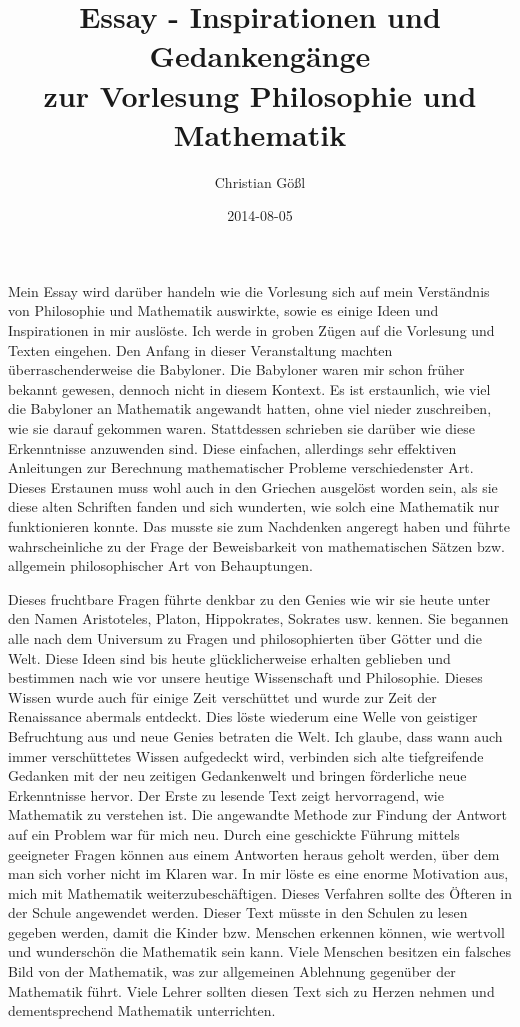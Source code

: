 \documentclass[DIN,
	fontsize=12pt,
a4paper]{scrartcl}
\title{Essay - Inspirationen und Gedankengänge\\
zur Vorlesung Philosophie und Mathematik}
\author{Christian Gößl}
\date{2014-08-05}
\begin{document}
\maketitle

\newpage

Mein Essay wird darüber handeln wie die Vorlesung sich auf mein Verständnis von Philosophie und Mathematik auswirkte, sowie es einige Ideen und Inspirationen in mir auslöste.
Ich werde in groben Zügen auf die Vorlesung und Texten eingehen.
Den Anfang in dieser Veranstaltung machten überraschenderweise die Babyloner.
Die Babyloner waren mir schon früher bekannt gewesen, dennoch nicht in diesem Kontext.
Es ist erstaunlich, wie viel die Babyloner an Mathematik angewandt hatten, ohne viel nieder zuschreiben, wie sie darauf gekommen waren.
Stattdessen schrieben sie darüber wie diese Erkenntnisse anzuwenden sind.
Diese einfachen, allerdings sehr effektiven Anleitungen zur Berechnung mathematischer Probleme verschiedenster Art.
Dieses Erstaunen muss wohl auch in den Griechen ausgelöst worden sein, als sie diese alten Schriften fanden und sich wunderten, wie solch eine Mathematik nur funktionieren konnte.
Das musste sie zum Nachdenken angeregt haben und führte wahrscheinliche zu der Frage der Beweisbarkeit von mathematischen Sätzen bzw. allgemein philosophischer Art von Behauptungen.

Dieses fruchtbare Fragen führte denkbar zu den Genies wie wir sie heute unter den Namen Aristoteles, Platon, Hippokrates, Sokrates usw. kennen.
Sie begannen alle nach dem Universum zu Fragen und philosophierten über Götter und die Welt.
Diese Ideen sind bis heute glücklicherweise erhalten geblieben und bestimmen nach wie vor unsere heutige Wissenschaft und Philosophie.
Dieses Wissen wurde auch für einige Zeit verschüttet und wurde zur Zeit der Renaissance abermals entdeckt.
Dies löste wiederum eine Welle von geistiger Befruchtung aus und neue Genies betraten die Welt.
Ich glaube, dass wann auch immer verschüttetes Wissen aufgedeckt wird, verbinden sich alte tiefgreifende Gedanken mit der neu zeitigen Gedankenwelt und bringen förderliche neue Erkenntnisse hervor.
Der Erste zu lesende Text zeigt hervorragend, wie Mathematik zu verstehen ist.
Die angewandte Methode zur Findung der Antwort auf ein Problem war für mich neu.
Durch eine geschickte Führung mittels geeigneter Fragen können aus einem Antworten heraus geholt werden, über dem man sich vorher nicht im Klaren war.
In mir löste es eine enorme Motivation aus, mich mit Mathematik weiterzubeschäftigen.
Dieses Verfahren sollte des Öfteren in der Schule angewendet werden.
Dieser Text müsste in den Schulen zu lesen gegeben werden, damit die Kinder bzw. Menschen erkennen können, wie wertvoll und wunderschön die Mathematik sein kann.
Viele Menschen besitzen ein falsches Bild von der Mathematik, was zur allgemeinen Ablehnung gegenüber der Mathematik führt.
Viele Lehrer sollten diesen Text sich zu Herzen nehmen und dementsprechend Mathematik unterrichten.
\end{document}
